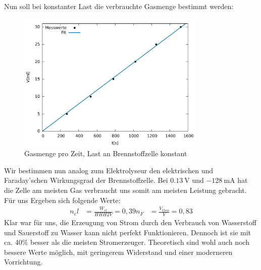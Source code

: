 Nun soll bei konstanter Last die verbrauchte Gasmenge bestimmt werden:
\begin{figure}[htbp]
	\centering
	\includegraphics[width=0.8\textwidth]{mess/aufg12.pdf}
	\caption{Gasmenge pro Zeit, Last an Brennstoffzelle konstant}
	\label{a12}
\end{figure}
Wir bestimmen nun analog zum Elektrolyseur den elektrischen und Faraday’schen Wirkungsgrad der Brennstoffzelle.
Bei $\SI{0.13}{\volt}$ und $\SI{-128}{\milli \ampere}$ hat die Zelle am meisten Gas verbraucht uns somit am meisten Leistung gebracht. Für uns Ergeben sich folgende Werte:
\begin{align*}
n_el &= \frac{W_{el}}{HHH2V}=0,39
n_F &= \frac{V_{theo}}{V}=0,83
\end{align*}
Klar war für uns, die Erzeugung von Strom durch den Verbrauch von Wasserstoff und Sauerstoff zu Wasser kann nicht perfekt Funktionieren. Dennoch ist sie mit ca. 40\% besser als die meisten Stromerzeuger. Theoretisch sind wohl auch noch bessere Werte möglich, mit geringerem Widerstand und einer moderneren Vorrichtung.
